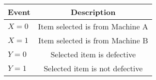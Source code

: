 
\begin{tabular}{|l|c|}
	\hline
	\textbf{Event} & \textbf{Description} \\
	\hline
	$X = 0$ &  Item selected is from Machine A \\
	\hline
	$X = 1$ &  Item selected is from Machine B \\
	\hline
	$Y = 0$ &  Selected item is defective \\
	\hline
	$Y = 1$ &  Selected item is not defective \\
	\hline
\end{tabular}

